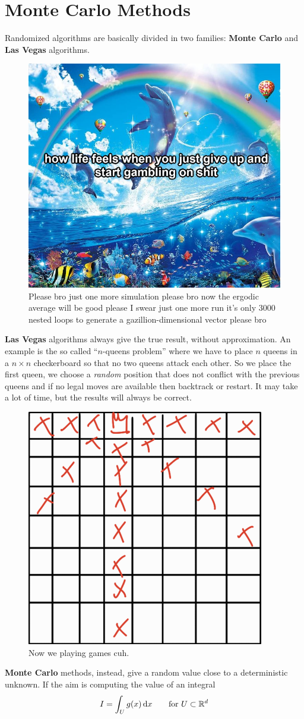 \documentclass[12pt]{report}
\begin{document}
\section{Monte Carlo Methods}
Randomized algorithms are basically divided in two families: \textbf{\textcolor{OrangeRed2}{Monte Carlo}} and \textbf{\textcolor{Gold2}{Las Vegas}} algorithms.
\begin{figure}[H]
	\centering
	\includegraphics[width=0.5\linewidth]{img/screenshot064}
	\caption{Please bro just one more simulation please bro now the ergodic average will be good please I swear just one more run it's only 3000 nested loops to generate a gazillion-dimensional vector please bro}
	\label{fig:screenshot064}
\end{figure}
\textbf{\textcolor{Gold2}{Las Vegas}} algorithms always give the true result, without approximation. An example is the so called ``$n$-queens problem'' where we have to place $n$ queens in a $n\times n$ checkerboard so that no two queens attack each other. So we place the first queen, we choose a \textit{random} position that does not conflict with the previous queens and if no legal moves are available then backtrack or restart. It may take a lot of time, but the results will always be correct.
\begin{figure}[H]
	\centering
	\includegraphics[width=0.5\linewidth]{img/screenshot065}
	\caption{Now we playing games cuh.}
	\label{fig:screenshot065}
\end{figure}
\textbf{\textcolor{OrangeRed2}{Monte Carlo}} methods, instead, give a random value close to a deterministic unknown. If the aim is computing the value of an integral
\begin{equation*}
	I=\int_{U}g(x)\mathop{}\!\mathrm{d} x\qquad\mathrm{for~}U\subset\mathbb{R}^{d}
\end{equation*}
\listoffigures  
\end{document}
